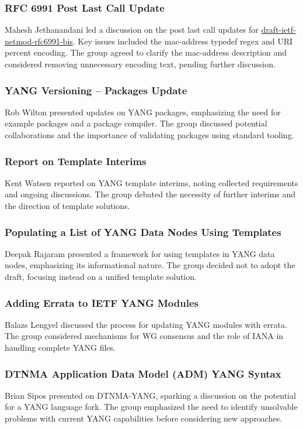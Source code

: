 \documentclass{article}
\begin{document}
\subsubsection{RFC 6991 Post Last Call Update}
Mahesh Jethanandani led a discussion on the post last call updates for \href{https://datatracker.ietf.org/doc/html/draft-ietf-netmod-rfc6991-bis}{draft-ietf-netmod-rfc6991-bis}. Key issues included the mac-address typedef regex and URI percent encoding. The group agreed to clarify the mac-address description and considered removing unnecessary encoding text, pending further discussion.

\subsubsection{YANG Versioning – Packages Update}
Rob Wilton presented updates on YANG packages, emphasizing the need for example packages and a package compiler. The group discussed potential collaborations and the importance of validating packages using standard tooling.

\subsubsection{Report on Template Interims}
Kent Watsen reported on YANG template interims, noting collected requirements and ongoing discussions. The group debated the necessity of further interims and the direction of template solutions.

\subsubsection{Populating a List of YANG Data Nodes Using Templates}
Deepak Rajaram presented a framework for using templates in YANG data nodes, emphasizing its informational nature. The group decided not to adopt the draft, focusing instead on a unified template solution.

\subsubsection{Adding Errata to IETF YANG Modules}
Balazs Lengyel discussed the process for updating YANG modules with errata. The group considered mechanisms for WG consensus and the role of IANA in handling complete YANG files.

\subsubsection{DTNMA Application Data Model (ADM) YANG Syntax}
Brian Sipos presented on DTNMA-YANG, sparking a discussion on the potential for a YANG language fork. The group emphasized the need to identify unsolvable problems with current YANG capabilities before considering new approaches.
\end{document}
